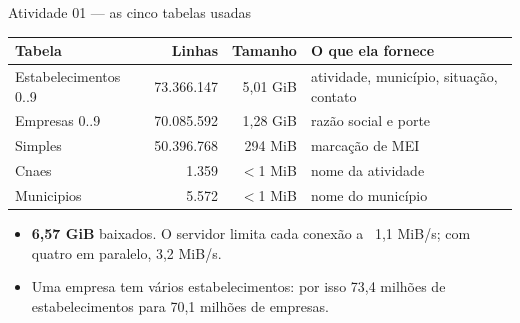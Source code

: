 \documentclass[aspectratio=169]{beamer}
\begin{document}
\begin{frame}{Atividade 01 --- as cinco tabelas usadas}
    \begin{table}
        \footnotesize
        \begin{tabular}{lrrl}
            \toprule
            Tabela & Linhas & Tamanho & O que ela fornece \\
            \midrule
            Estabelecimentos 0..9 & 73.366.147 & 5,01 GiB & atividade, município, situação, contato \\
            Empresas 0..9         & 70.085.592 & 1,28 GiB & razão social e porte \\
            Simples               & 50.396.768 & 294 MiB  & marcação de MEI \\
            Cnaes                 &      1.359 & $<$1 MiB & nome da atividade \\
            Municipios            &      5.572 & $<$1 MiB & nome do município \\
            \bottomrule
        \end{tabular}
    \end{table}

    \begin{itemize}
        \item \textbf{6,57 GiB} baixados. O servidor limita cada conexão a
              ~1,1 MiB/s; com quatro em paralelo, 3,2 MiB/s.
        \item Uma empresa tem vários estabelecimentos: por isso 73,4 milhões de
              estabelecimentos para 70,1 milhões de empresas.
    \end{itemize}
\end{frame}
\end{document}
